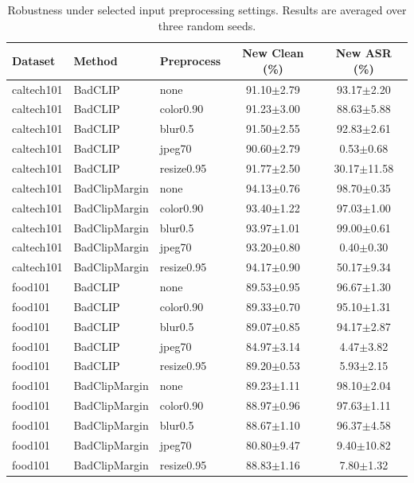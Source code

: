 \begin{table}[t]
\centering
\caption{Robustness under selected input preprocessing settings. Results are averaged over three random seeds.}
\label{tab:preprocess_robustness_selected}
\begin{tabular}{lllcc}
\toprule
Dataset & Method & Preprocess & New Clean (\%) & New ASR (\%) \\
\midrule
caltech101 & BadCLIP & none & 91.10$\pm$2.79 & 93.17$\pm$2.20 \\
caltech101 & BadCLIP & color0.90 & 91.23$\pm$3.00 & 88.63$\pm$5.88 \\
caltech101 & BadCLIP & blur0.5 & 91.50$\pm$2.55 & 92.83$\pm$2.61 \\
caltech101 & BadCLIP & jpeg70 & 90.60$\pm$2.79 & 0.53$\pm$0.68 \\
caltech101 & BadCLIP & resize0.95 & 91.77$\pm$2.50 & 30.17$\pm$11.58 \\
caltech101 & BadClipMargin & none & 94.13$\pm$0.76 & 98.70$\pm$0.35 \\
caltech101 & BadClipMargin & color0.90 & 93.40$\pm$1.22 & 97.03$\pm$1.00 \\
caltech101 & BadClipMargin & blur0.5 & 93.97$\pm$1.01 & 99.00$\pm$0.61 \\
caltech101 & BadClipMargin & jpeg70 & 93.20$\pm$0.80 & 0.40$\pm$0.30 \\
caltech101 & BadClipMargin & resize0.95 & 94.17$\pm$0.90 & 50.17$\pm$9.34 \\
\midrule
food101 & BadCLIP & none & 89.53$\pm$0.95 & 96.67$\pm$1.30 \\
food101 & BadCLIP & color0.90 & 89.33$\pm$0.70 & 95.10$\pm$1.31 \\
food101 & BadCLIP & blur0.5 & 89.07$\pm$0.85 & 94.17$\pm$2.87 \\
food101 & BadCLIP & jpeg70 & 84.97$\pm$3.14 & 4.47$\pm$3.82 \\
food101 & BadCLIP & resize0.95 & 89.20$\pm$0.53 & 5.93$\pm$2.15 \\
food101 & BadClipMargin & none & 89.23$\pm$1.11 & 98.10$\pm$2.04 \\
food101 & BadClipMargin & color0.90 & 88.97$\pm$0.96 & 97.63$\pm$1.11 \\
food101 & BadClipMargin & blur0.5 & 88.67$\pm$1.10 & 96.37$\pm$4.58 \\
food101 & BadClipMargin & jpeg70 & 80.80$\pm$9.47 & 9.40$\pm$10.82 \\
food101 & BadClipMargin & resize0.95 & 88.83$\pm$1.16 & 7.80$\pm$1.32 \\
\bottomrule
\end{tabular}
\end{table}
